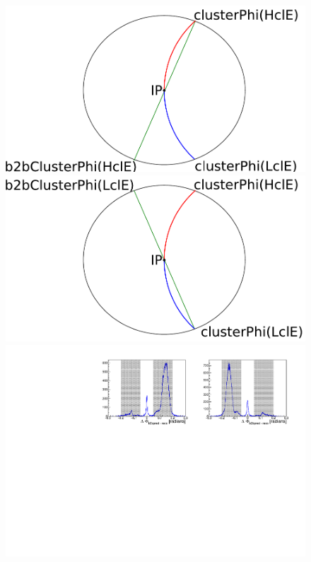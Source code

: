 \documentclass[a4paper,11pt,twosided,final,german,openbib,pdftex,listof=totoc,bibliography=totoc]{scrbook}
\begin{document}
\begin{figure}[h!]
	

\begin{minipage}[b]{\textwidth}
\centering


	\begin{minipage}[b]{0.45\linewidth}
		\centering
		\includegraphics[width=\textwidth]{Bilder/b2b_2}

	\end{minipage}
	\hspace{0.5cm}
	\begin{minipage}[b]{0.45\linewidth}
		\centering
		\includegraphics[width=\textwidth]{Bilder/b2b_3}
	\end{minipage}
	\includegraphics[width=\textwidth]{Plots/sb2b_Data.pdf}
	


\end{minipage}
\end{figure}
\end{document}

